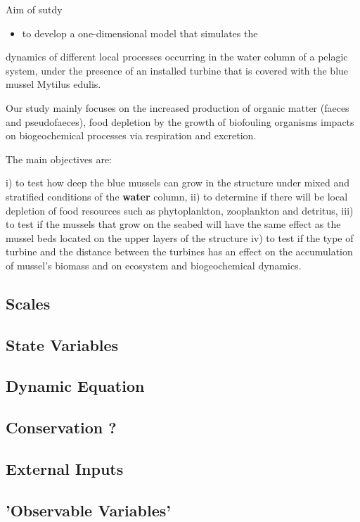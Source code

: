 \documentclass[final,xcolor=dvipsnames]{beamer}
\begin{document}
\begin{frame}
\begin{block}{Aim of sutdy}
\begin{itemize}
    \item to develop a one-dimensional model that simulates the
\end{itemize} 
dynamics of different local processes occurring in the water column of a pelagic
system, under the presence of an installed turbine that is covered with the blue
mussel Mytilus edulis.

Our study mainly focuses on
the increased production of organic matter (faeces and pseudofaeces),
food depletion by the growth of biofouling organisms
impacts on biogeochemical processes via respiration and excretion. 

The main objectives are: 

i) to test how deep the blue mussels can grow in the structure under mixed and stratified conditions of the \textbf<2>{water} column,
ii) to determine if there will be local depletion of food resources
such as phytoplankton, zooplankton and detritus,
iii) to test if the mussels that grow on the seabed will have the same effect as the mussel beds located on the upper layers of the structure iv) to test if the type of turbine and the distance between the turbines has an effect on the accumulation of mussel’s biomass and on ecosystem and biogeochemical dynamics.
\end{block}
\end{frame}

\subsection{Scales}
\subsection{State Variables}
\subsection{Dynamic Equation}
\subsection{Conservation ?}
\subsection{External Inputs}
\subsection{'Observable Variables'}
\end{document}
